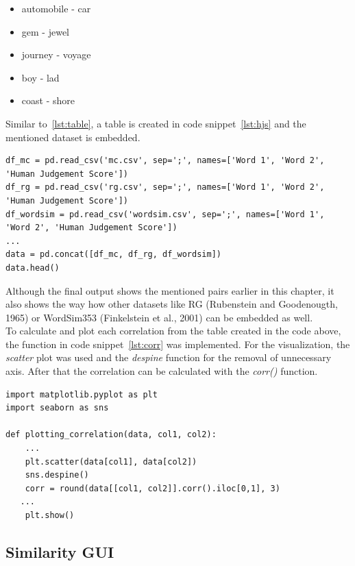 \documentclass[conference]{IEEEtran}
\begin{document}
\begin{itemize}
\item automobile - car
\item gem - jewel
\item journey - voyage
\item boy - lad
\item coast - shore
\end{itemize}

Similar to~\ref{lst:table}, a table is created in code snippet~\ref{lst:hjs} and the mentioned dataset is embedded.

\begin{lstlisting}[frame=single, label=lst:hjs, caption={HJS correlation with WUP, PATH, LCH}, captionpos=b]
df_mc = pd.read_csv('mc.csv', sep=';', names=['Word 1', 'Word 2', 'Human Judgement Score'])
df_rg = pd.read_csv('rg.csv', sep=';', names=['Word 1', 'Word 2', 'Human Judgement Score'])
df_wordsim = pd.read_csv('wordsim.csv', sep=';', names=['Word 1', 'Word 2', 'Human Judgement Score'])
...
data = pd.concat([df_mc, df_rg, df_wordsim])
data.head()
\end{lstlisting}

Although the final output shows the mentioned pairs earlier in this chapter, it also shows the way how other datasets like RG (Rubenstein and Goodenougth, 1965) or WordSim353 (Finkelstein et al., 2001) can be embedded as well.\\
To calculate and plot each correlation from the table created in the code above, the function in code snippet~\ref{lst:corr} was implemented. For the visualization, the \textit{scatter} plot was used and the \textit{despine} function for the removal of unnecessary axis. After that the correlation can be calculated with the \textit{corr()} function.

\begin{lstlisting}[frame=single, label=lst:corr, caption={Correlation calculation function}, captionpos=b]
import matplotlib.pyplot as plt
import seaborn as sns

def plotting_correlation(data, col1, col2):
    ...
    plt.scatter(data[col1], data[col2])
    sns.despine()
    corr = round(data[[col1, col2]].corr().iloc[0,1], 3)
   ...
    plt.show()
\end{lstlisting}

\subsection{Similarity GUI}\label{subsec:gui}
\end{document}
